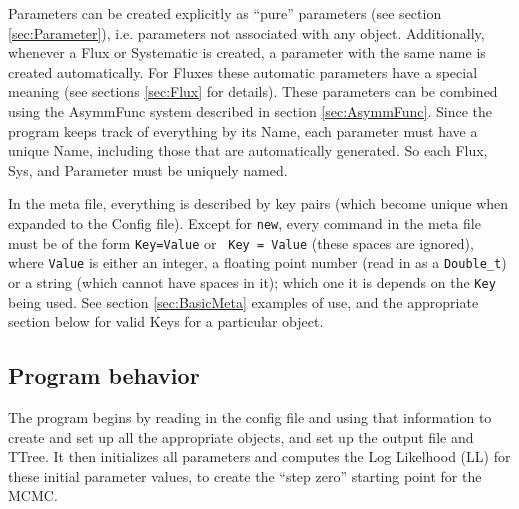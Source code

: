 Parameters can be created explicitly as ``pure'' parameters (see
section \ref{sec:Parameter}), i.e. parameters not associated with
any object.  Additionally, whenever a Flux or Systematic is
created, a parameter with the same name is created automatically.  For
Fluxes these automatic parameters have a special meaning (see
sections \ref{sec:Flux} for details).  These
parameters can be combined using the AsymmFunc system described in
section \ref{sec:AsymmFunc}.  Since the program keeps track of
everything by its Name, each parameter must have a unique Name,
including those that are automatically generated.  So each Flux, Sys,
and Parameter must be uniquely named.

In the meta file, everything is described by key pairs (which become
unique when expanded to the Config file).  Except for {\tt new}, every
command in the meta file must be of the form {\tt Key=Value} or {\tt
  Key = Value} (these spaces are ignored), where {\tt Value} is either
an integer, a floating point number (read in as a {\tt Double\_t}) or
a string (which cannot have spaces in it); which one it is depends on
the {\tt Key} being used.  See section \ref{sec:BasicMeta} examples of
use, and the appropriate section below for valid Keys for a particular
object.

\subsection{Program behavior}
\label{sec:ProgramBehavior}
The program begins by reading in the config file and using that
information to create and set up all the appropriate objects, and set
up the output file and TTree.  It then initializes all parameters and
computes the Log Likelhood (LL) for these initial parameter values, to
create the ``step zero'' starting point for the MCMC.

